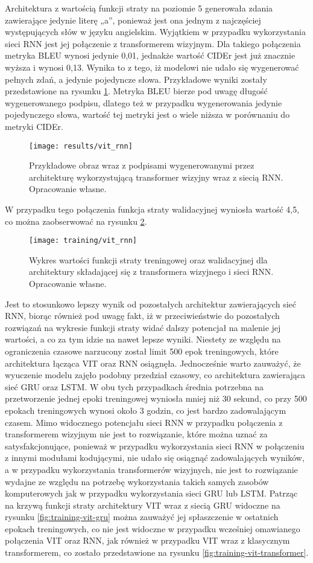 \noindent Architektura z wartością funkcji straty na poziomie 5 generowała zdania zawierające jedynie literę „a”, ponieważ jest ona jednym z najczęściej występujących słów w języku angielskim. Wyjątkiem w przypadku wykorzystania sieci RNN jest jej połączenie z transformerem wizyjnym. Dla takiego połączenia metryka BLEU wynosi jedynie 0,01, jednakże wartość CIDEr jest już znacznie wyższa i wynosi 0,13. Wynika to z tego, iż modelowi nie udało się wygenerować pełnych zdań, a jedynie pojedyncze słowa. Przykładowe wyniki zostały przedstawione na rysunku \ref{fig:results-vit-rnn}. Metryka BLEU bierze pod uwagę długość wygenerowanego podpisu, dlatego też w przypadku wygenerowania jedynie pojedynczego słowa, wartość tej metryki jest o wiele niższa w porównaniu do metryki CIDEr.
\begin{figure}[H]
    \centering
    \texttt{[image: results/vit\_rnn]}
    \caption{Przykładowe obraz wraz z podpisami wygenerowanymi przez architekturę wykorzystującą transformer wizyjny wraz z siecią RNN. Opracowanie własne.}
    \label{fig:results-vit-rnn}
\end{figure}
\noindent W przypadku tego połączenia funkcja straty walidacyjnej wyniosła wartość 4,5, co można zaobserwować na rysunku \ref{fig:training-vit-rnn}.
\begin{figure}[H]
    \centering
    \texttt{[image: training/vit\_rnn]}
    \caption{Wykres wartości funkcji straty treningowej oraz walidacyjnej dla architektury składającej się z transformera wizyjnego i sieci RNN. Opracowanie własne.}
    \label{fig:training-vit-rnn}
\end{figure}
\noindent Jest to stosunkowo lepszy wynik od pozostałych architektur zawierających sieć RNN, biorąc również pod uwagę fakt, iż w przeciwieństwie do pozostałych rozwiązań na wykresie funkcji straty widać dalszy potencjał na malenie jej wartości, a co za tym idzie na nawet lepsze wyniki. Niestety ze względu na ograniczenia czasowe narzucony został limit 500 epok treningowych, które architektura łącząca VIT oraz RNN osiągnęła. Jednocześnie warto zauważyć, że wyuczenie modelu zajęło podobny przedział czasowy, co architektura zawierająca sieć GRU oraz LSTM. W obu tych przypadkach średnia potrzebna na przetworzenie jednej epoki treningowej wyniosła mniej niż 30 sekund, co przy 500 epokach treningowych wynosi około 3 godzin, co jest bardzo zadowalającym czasem. Mimo widocznego potencjału sieci RNN w przypadku połączenia z transformerem wizyjnym nie jest to rozwiązanie, które można uznać za satysfakcjonujące, ponieważ w przypadku wykorzystania sieci RNN w połączeniu z innymi modułami kodującymi, nie udało się osiągnąć zadowalających wyników, a w przypadku wykorzystania transformerów wizyjnych, nie jest to rozwiązanie wydajne ze względu na potrzebę wykorzystania takich samych zasobów komputerowych jak w przypadku wykorzystania sieci GRU lub LSTM. Patrząc na krzywą funkcji straty architektury VIT wraz z siecią GRU widoczne na rysunku \ref{fig:training-vit-gru} można zauważyć jej spłaszczenie w ostatnich epokach treningowych, co nie jest widoczne w przypadku wcześniej omawianego połączenia VIT oraz RNN, jak również w przypadku VIT wraz z klasycznym transformerem, co zostało przedstawione na rysunku \ref{fig:training-vit-transformer}.
